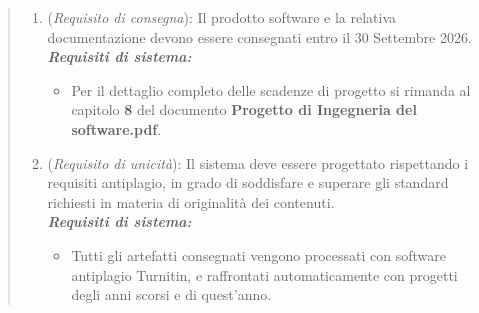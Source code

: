 \begin{quote}
\begin{enumerate}[label=\textit{RO\arabic*}]
  \item (\textit{Requisito di consegna}): Il prodotto software e la relativa documentazione devono essere consegnati entro il 30 Settembre 2026. \\
  \textbf{\textit{Requisiti di sistema:}} 
    \begin{itemize}
        \item Per il dettaglio completo delle scadenze di progetto si rimanda al capitolo \textbf{8} del documento \textbf{Progetto di Ingegneria del software.pdf}. 
    \end{itemize}
  
  \item (\textit{Requisito di unicità}): Il sistema deve essere progettato rispettando i requisiti antiplagio, in grado di soddisfare e superare gli standard richiesti in materia di originalità dei contenuti. \\
  \textbf{\textit{Requisiti di sistema:}} 
    \begin{itemize}
        \item Tutti gli artefatti consegnati vengono processati con software antiplagio Turnitin, e raffrontati automaticamente con progetti degli anni scorsi e di quest’anno.
    \end{itemize}
\end{enumerate} 
\end{quote}